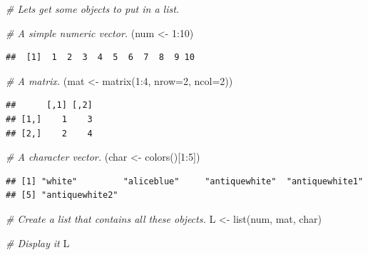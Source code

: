 \documentclass[
]{book}
\newenvironment{Shaded}{\begin{snugshade}}{\end{snugshade}}
\newcommand{\AttributeTok}[1]{\textcolor[rgb]{0.77,0.63,0.00}{#1}}
\newcommand{\CommentTok}[1]{\textcolor[rgb]{0.56,0.35,0.01}{\textit{#1}}}
\newcommand{\DecValTok}[1]{\textcolor[rgb]{0.00,0.00,0.81}{#1}}
\newcommand{\FunctionTok}[1]{\textcolor[rgb]{0.00,0.00,0.00}{#1}}
\newcommand{\NormalTok}[1]{#1}
\newcommand{\OtherTok}[1]{\textcolor[rgb]{0.56,0.35,0.01}{#1}}
\newcommand{\SpecialCharTok}[1]{\textcolor[rgb]{0.00,0.00,0.00}{#1}}
\begin{document}
\begin{Shaded}
\begin{Highlighting}[]
\CommentTok{\# Let\textquotesingle{}s get some objects to put in a list.}

\CommentTok{\# A simple numeric vector.}
\NormalTok{(num }\OtherTok{\textless{}{-}} \DecValTok{1}\SpecialCharTok{:}\DecValTok{10}\NormalTok{)}
\end{Highlighting}
\end{Shaded}

\begin{verbatim}
##  [1]  1  2  3  4  5  6  7  8  9 10
\end{verbatim}

\begin{Shaded}
\begin{Highlighting}[]
\CommentTok{\# A matrix.}
\NormalTok{(mat }\OtherTok{\textless{}{-}} \FunctionTok{matrix}\NormalTok{(}\DecValTok{1}\SpecialCharTok{:}\DecValTok{4}\NormalTok{, }\AttributeTok{nrow=}\DecValTok{2}\NormalTok{, }\AttributeTok{ncol=}\DecValTok{2}\NormalTok{))}
\end{Highlighting}
\end{Shaded}

\begin{verbatim}
##      [,1] [,2]
## [1,]    1    3
## [2,]    2    4
\end{verbatim}

\begin{Shaded}
\begin{Highlighting}[]
\CommentTok{\# A character vector.}
\NormalTok{(char }\OtherTok{\textless{}{-}} \FunctionTok{colors}\NormalTok{()[}\DecValTok{1}\SpecialCharTok{:}\DecValTok{5}\NormalTok{])}
\end{Highlighting}
\end{Shaded}

\begin{verbatim}
## [1] "white"         "aliceblue"     "antiquewhite"  "antiquewhite1"
## [5] "antiquewhite2"
\end{verbatim}

\begin{Shaded}
\begin{Highlighting}[]
\CommentTok{\# Create a list that contains all these objects.}
\NormalTok{L }\OtherTok{\textless{}{-}} \FunctionTok{list}\NormalTok{(num, mat, char)}

\CommentTok{\# Display it}
\NormalTok{L}
\end{Highlighting}
\end{Shaded}
\end{document}
